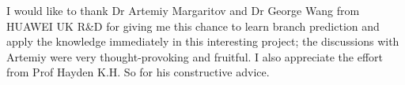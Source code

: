 
\begin{acknowledgements}      


I would like to thank Dr Artemiy Margaritov and Dr George Wang from HUAWEI UK R\&D for giving me this chance to learn branch prediction and apply the knowledge immediately in this interesting project; the discussions with Artemiy were very 
thought-provoking and fruitful. I also appreciate the effort from Prof Hayden K.H. So for his constructive advice.
\par\hspace*{\fill}\par

\end{acknowledgements}
